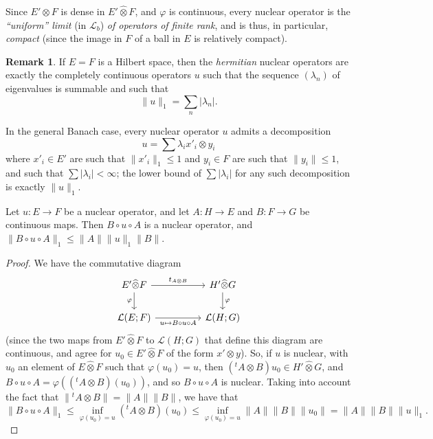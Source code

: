 \documentclass{article}
\theoremstyle{plain}
\newenvironment{proposition}[1]
    {\renewcommand\theinnercustomproposition{#1}\innercustomproposition}
    {\endinnercustomproposition}
\theoremstyle{definition}
\newtheorem*{remark}{Remark}
\newcommand{\LL}{\mathcal{L}}
\newcommand{\cotimes}{\widehat{\otimes}}
\newcommand{\transpose}[1]{{}^t\!{#1}}
\renewcommand{\leq}{\leqslant}
\newcommand{\oldpage}[1]{\marginpar{\footnotesize$\Big\vert$ \textit{p.~#1}}}
\begin{document}
Since $E'\otimes F$ is dense in $E'\cotimes F$, and $\varphi$ is continuous, every nuclear operator is the \emph{``uniform'' limit} (in $\LL_b$) \emph{of operators of finite rank}, and is thus, in particular, \emph{compact} (since the image in $F$ of a ball in $E$ is relatively compact).

\begin{remark}
  If $E=F$ is a Hilbert space, then the \emph{hermitian} nuclear operators are exactly the completely continuous operators $u$ such that the sequence $(\lambda_n)$ of eigenvalues is summable and such that
  \[
    \|u\|_1 = \sum_n|\lambda_n|.
  \]

  In the general Banach case, every nuclear operator $u$ admits a decomposition
  \[
    u = \sum\lambda_i x'_i\otimes y_i
  \]
  where $x'_i\in E'$ are such that $\|x'_i\|_1\leq1$ and $y_i\in F$ are such that $\|y_i\|\leq1$, and such that $\sum|\lambda_i|<\infty$;
  the lower bound of $\sum|\lambda_i|$ for any such decomposition is exactly $\|u\|_1$.
\end{remark}

\begin{proposition}{2}
\label{proposition2}
  Let $u\colon E\to F$ be a nuclear operator, and let $A\colon H\to E$ and $B\colon F\to G$ be continuous maps.
  Then $B\circ u\circ A$ is a nuclear operator, and $\|B\circ u\circ A\|_1 \leq \|A\|\|u\|_1\|B\|$.
\end{proposition}

\begin{proof}
  We have the commutative diagram
  \[
    \begin{tikzcd}[column sep=huge]
      E'\cotimes F \ar[r,"t_{A\otimes B}"] \ar[d,swap,"\varphi"]
      & H'\cotimes G \ar[d,"\varphi"]
    \\\LL(E;F) \ar[r,swap,"u\mapsto B\circ u\circ A"]
      & \LL(H;G)
    \end{tikzcd}
  \]
  (since the two maps from $E'\cotimes F$ to $\LL(H;G)$ that define this diagram are continuous, and agree for $u_0\in E'\cotimes F$ of the form $x'\otimes y$).
  So, if $u$ is nuclear, with $u_0$ an element of $E\cotimes F$ such that $\varphi(u_0)=u$, then $(\transpose{A}\otimes B)u_0\in H'\cotimes G$, and $B\circ u\circ A=\varphi((\transpose{A}\otimes B)(u_0))$, and so $B\circ u\circ A$ is nuclear.
  Taking into account the fact that $\|\transpose{A}\otimes B\|=\|A\|\|B\|$,
\oldpage{4}
  we have that
  \[
    \|B\circ u\circ A\|_1
    \leq \inf_{\varphi(u_0)=u}(\transpose{A}\otimes B)(u_0)
    \leq \inf_{\varphi(u_0)=u}\|A\|\|B\|\|u_0\|
    = \|A\|\|B\|\|u\|_1.
  \]
\end{proof}
\end{document}
